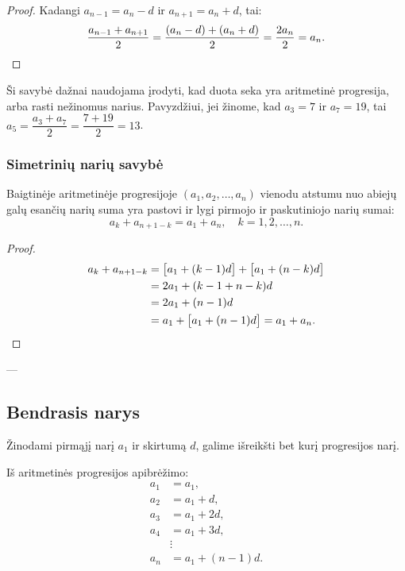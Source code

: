 \begin{proof}
Kadangi $a_{n-1} = a_n - d$ ir $a_{n+1} = a_n + d$, tai:
\[
\frac{a_{n-1} + a_{n+1}}{2} = \frac{(a_n - d) + (a_n + d)}{2} = \frac{2a_n}{2} = a_n. \qedhere
\]
\end{proof}

\begin{tcolorbox}[colback=blue!5!white, colframe=blue!60!black, title={Svarbi pastaba}]
Ši savybė dažnai naudojama įrodyti, kad duota seka yra aritmetinė progresija, arba rasti nežinomus narius. Pavyzdžiui, jei žinome, kad $a_3 = 7$ ir $a_7 = 19$, tai $a_5 = \dfrac{a_3 + a_7}{2} = \dfrac{7 + 19}{2} = 13$.
\end{tcolorbox}

\subsubsection*{Simetrinių narių savybė}

\begin{theorem}
Baigtinėje aritmetinėje progresijoje $(a_1, a_2, \ldots, a_n)$ vienodu atstumu nuo abiejų galų esančių narių suma yra pastovi ir lygi pirmojo ir paskutiniojo narių sumai:
\[
a_k + a_{n+1-k} = a_1 + a_n, \quad k = 1, 2, \ldots, n.
\]
\end{theorem}

\begin{proof}
\begin{align*}
a_k + a_{n+1-k} &= \bigl[a_1 + (k-1)d\bigr] + \bigl[a_1 + (n-k)d\bigr] \\
&= 2a_1 + (k - 1 + n - k)d \\
&= 2a_1 + (n-1)d \\
&= a_1 + \bigl[a_1 + (n-1)d\bigr] = a_1 + a_n. \qedhere
\end{align*}
\end{proof}

---

\subsection{Bendrasis narys}

Žinodami pirmąjį narį $a_1$ ir skirtumą $d$, galime išreikšti bet kurį progresijos narį.

Iš aritmetinės progresijos apibrėžimo:
\begin{align*}
a_1 &= a_1,\\
a_2 &= a_1 + d,\\
a_3 &= a_1 + 2d,\\
a_4 &= a_1 + 3d,\\
&\vdots\\
a_n &= a_1 + (n-1)d.
\end{align*}


